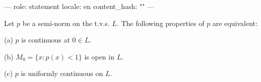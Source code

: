 ---
role: statement
locale: en
content_hash: ""
---

Let $p$ be a semi-norm on the t.v.s. $L$. The following properties of $p$ are equivalent:

(a) $p$ is continuous at $0 \in L$.

(b) $M_0 = \{x : p(x) < 1\}$ is open in $L$.

(c) $p$ is uniformly continuous on $L$.
